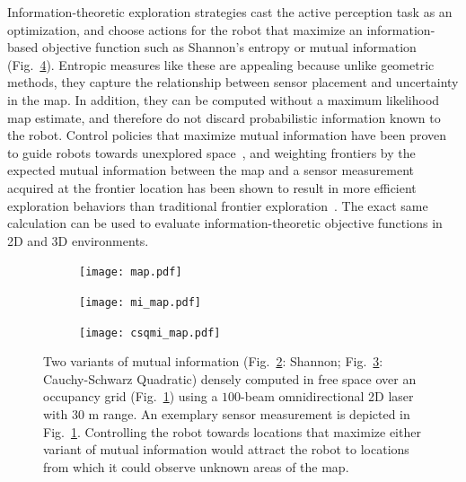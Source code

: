 Information-theoretic exploration strategies cast the active perception task as
an optimization, and choose actions for the robot that maximize an information-based objective function such
as Shannon's entropy or mutual
information~\cite{bourgault2002information,kollar2008efficient,charrow2015icra,julian2013mutual}
(Fig.~\ref{fig:mi_vs_csqmi}).
Entropic measures like these are appealing because unlike geometric methods,
they capture the relationship between sensor placement and uncertainty in the
map. In addition, they can be computed without a maximum likelihood map estimate, and
therefore do not discard probabilistic information known to the robot. Control policies
that maximize mutual information have been proven to guide robots
towards unexplored space~\cite{julian2013mutual}, and weighting frontiers by
the expected mutual information between the map and a sensor measurement
acquired at the frontier location has been shown to result in more efficient exploration
behaviors than traditional frontier exploration~\cite{charrow2015icra}.
The exact same calculation can be used to evaluate information-theoretic objective
functions in 2D and 3D environments.

\begin{figure}[t]
    \centering
    \begin{subfigure}[t]{0.31\textwidth}
        \centering
        \texttt{[image: map.pdf]}
        \caption{\label{fig:og}}
    \end{subfigure}
    \begin{subfigure}[t]{0.31\textwidth}
        \centering
        \texttt{[image: mi\_map.pdf]}
        \caption{\label{fig:og_mi}}
    \end{subfigure}
    \begin{subfigure}[t]{0.31\textwidth}
        \centering
        \texttt{[image: csqmi\_map.pdf]}
        \caption{\label{fig:og_csqmi}}
    \end{subfigure}
    \caption{Two variants of mutual information (Fig.~\ref{fig:og_mi}: Shannon;
    Fig.~\ref{fig:og_csqmi}: Cauchy-Schwarz Quadratic) densely computed in free space
  over an occupancy grid (Fig.~\ref{fig:og}) using a $100$-beam omnidirectional 2D
laser with $30$ m range. An exemplary sensor measurement is depicted in
Fig.~\ref{fig:og}. Controlling the robot towards locations that maximize either variant
of mutual information would attract the robot to locations from which it
could observe unknown areas of the map. \label{fig:mi_vs_csqmi}}
\end{figure}


